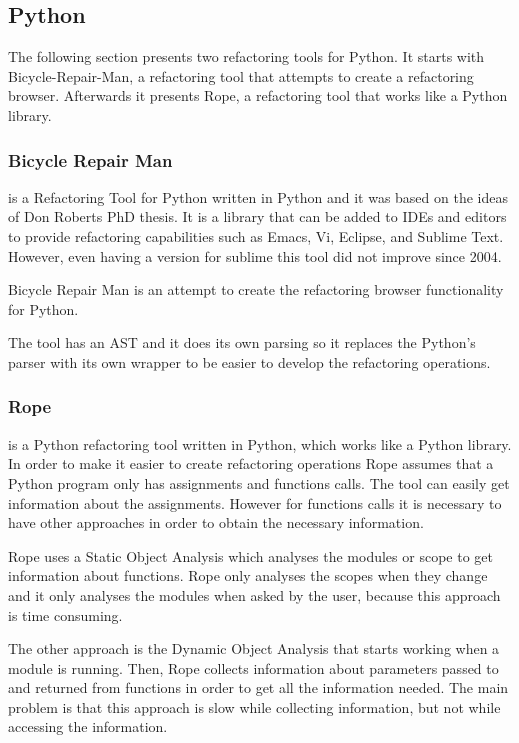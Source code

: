 \subsection{Python}

The following section presents two refactoring tools for Python. 
It starts with Bicycle-Repair-Man, a refactoring tool that attempts to create a refactoring browser. 
Afterwards it presents Rope, a refactoring tool that works like a Python library.

\subsubsection{Bicycle Repair Man}

 is a Refactoring Tool for Python written in Python and it was based on the ideas of Don Roberts PhD thesis. 
 It is a library that can be added to IDEs and editors to provide refactoring capabilities such as Emacs, Vi, Eclipse, and Sublime Text. 
 However, even having a version for sublime this tool did not improve since 2004.

Bicycle Repair Man is an attempt to create the refactoring browser functionality for Python. 

The tool has an AST and it does its own parsing so it replaces the Python's parser with its own wrapper to be easier to develop the refactoring operations.


\subsubsection{Rope}

 is a Python refactoring tool written in Python, which works like a Python library.
In order to make it easier to create refactoring operations Rope assumes that a Python program only has assignments and functions calls. %
The tool can easily get information about the assignments. 
However for functions calls it is necessary to have other approaches in order to obtain the necessary information. 

Rope uses a Static Object Analysis which analyses the modules or scope to get information about functions. 
Rope only analyses the scopes when they change and it only analyses the modules when asked by the user, because this approach is time consuming. 

The other approach is the Dynamic Object Analysis that starts working when a module is running. 
Then, Rope collects information about parameters passed to and returned from functions in order to get all the information needed. 
The main problem is that this approach is slow while collecting information, but not while accessing the information.

